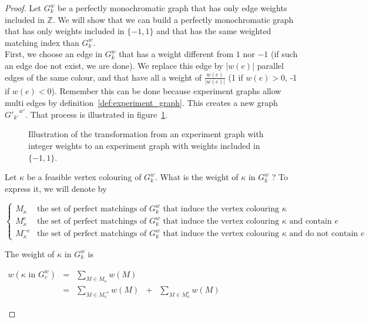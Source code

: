 \begin{proof}
    Let $G_k^w$ be a perfectly monochromatic graph that has only edge weights included in $\mathbb{Z}$.
    We will show that we can build a perfectly monochromatic graph that has only weights included in $\{-1, 1\}$ and that has the same weighted matching index than $G_k^w$. \\

    First, we choose an edge in $G_k^w$ that has a weight different from $1$ nor $-1$ (if such an edge doe not exist, we are done).
    We replace this edge by $|w(e)|$ parallel edges of the same colour, and that have all a weight of $\frac{w(e)}{|w(e)|}$ (1 if $w(e) > 0$, -1 if $w(e) < 0$).
    Remember this can be done because experiment graphs allow multi edges by definition~\ref{def:experiment_graph}.
    This creates a new graph ${G'_{k'}}^{w'}$.
    That process is illustrated in figure~\ref{fig:demo_integers}.\\

    \begin{figure}[H]
        \caption{Illustration of the transformation from an experiment graph with integer weights to an experiment graph with weights included in $\{-1, 1\}$.}
        \label{fig:demo_integers}
    \end{figure}

    Let $\kappa$ be a feasible vertex colouring of $G_k^w$.
    What is the weight of $\kappa$ in $G_k^w$ ? To express it, we will denote by
    \begin{center}
        $\left\{
            \begin{array}{ll}
                M_{\kappa}          & \mbox{the set of perfect matchings of } G_k^w \mbox{ that induce the vertex colouring } \kappa \\
                M_{\kappa}^e        & \mbox{the set of perfect matchings of } G_k^w \mbox{ that induce the vertex colouring } \kappa \mbox{ and contain } e \\
                M_{\kappa}^{\neg e} & \mbox{the set of perfect matchings of } G_k^w \mbox{ that induce the vertex colouring } \kappa \mbox{ and do not contain } e
            \end{array}
        \right.$
    \end{center}

    The weight of $\kappa$ in $G_k^w$ is

    \begin{center}
        $\begin{array}{lclcl}
            w(\kappa \mbox{ in } G_c^w)
                & = & \sum\limits_{M \in M_{\kappa}} w(M) \\
                & = & \sum\limits_{M \in M_{\kappa}^{\neg e}} w(M) & + & \sum\limits_{M \in M_{\kappa}^{e}} w(M)
        \end{array}$
    \end{center}


\end{proof}

